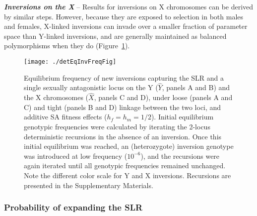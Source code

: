 \documentclass{article}[12pt]
\begin{document}
\vspace{12pt}

{\bf \itshape Inversions on the X} -- Results for inversions on X chromosomes can be derived by similar steps. However, because they are exposed to selection in both males and females, X-linked inversions can invade over a smaller fraction of parameter space than Y-linked inversions, and are generally maintained as balanced polymorphisms when they do (Figure~\ref{fig:detInvFreqSA}). 
\vspace{12pt}




 \begin{figure}[!htbp]
 \centering
 \texttt{[image: ./detEqInvFreqFig]}
 \caption{Equilibrium frequency of new inversions capturing the SLR and a single sexually antagonistic locus on the Y ($\hat{Y}$, panels A and B) and the X chromosomes ($\hat{X}$, panels C and D), under loose (panels A and C) and tight (panels B and D) linkage between the two loci, and additive SA fitness effects ($h_f = h_m = 1/2$). Initial equilibrium genotypic frequencies were calculated by iterating the 2-locus deterministic recursions in the absence of an inversion. Once this initial equilibrium was reached, an (heterozygote) inversion genotype was introduced at low frequency ($10^{-6}$), and the recursions were again iterated until all genotypic frequencies remained unchanged. Note the different color scale for Y and X inversions. Recursions are presented in the Supplementary Materials.}
 \label{fig:detInvFreqSA}
 \end{figure}






\subsubsection*{Probability of expanding the SLR}\label{sec:ProbExpSLR}
\end{document}
